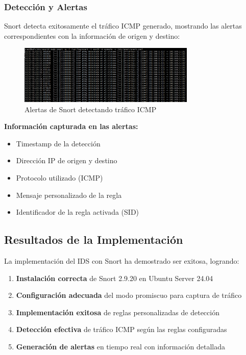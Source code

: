 \documentclass[12pt,a4paper]{article}
\begin{document}
\subsubsection{Detección y Alertas}

Snort detecta exitosamente el tráfico ICMP generado, mostrando las alertas
correspondientes con la información de origen y destino:

\begin{figure}[H]
  \centering
  \includegraphics[width=0.75\textwidth]{./assets/imga18.png}
  \caption{Alertas de Snort detectando tráfico ICMP}
  \label{fig:snort-alerts}
\end{figure}

\textbf{Información capturada en las alertas:}
\begin{itemize}
  \item Timestamp de la detección
  \item Dirección IP de origen y destino
  \item Protocolo utilizado (ICMP)
  \item Mensaje personalizado de la regla
  \item Identificador de la regla activada (SID)
\end{itemize}

\subsection{Resultados de la Implementación}

La implementación del IDS con Snort ha demostrado ser exitosa, logrando:

\begin{enumerate}
  \item \textbf{Instalación correcta} de Snort 2.9.20 en Ubuntu Server 24.04
  \item \textbf{Configuración adecuada} del modo promiscuo para captura de tráfico
  \item \textbf{Implementación exitosa} de reglas personalizadas de detección
  \item \textbf{Detección efectiva} de tráfico ICMP según las reglas configuradas
  \item \textbf{Generación de alertas} en tiempo real con información detallada
\end{enumerate}
\end{document}
